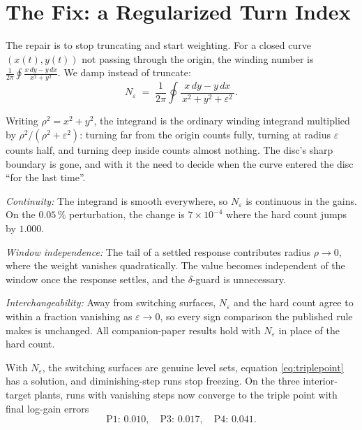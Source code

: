 \documentclass[twocolumn]{ifacconf}
\newcommand{\Neps}{N_{\varepsilon}}
\begin{document}
\section{The Fix: a Regularized Turn Index}
\label{sec:regularized}

The repair is to stop truncating and start weighting. For a closed curve
$(x(t), y(t))$ not passing through the origin, the winding number is
$\frac{1}{2\pi} \oint \frac{x\,dy - y\,dx}{x^2 + y^2}$. We damp instead of
truncate:
\begin{equation}
\Neps \;=\; \frac{1}{2\pi} \oint
\frac{x\,dy - y\,dx}{\,x^2 + y^2 + \varepsilon^2\,}.
\label{eq:neps}
\end{equation}

Writing $\rho^2 = x^2 + y^2$, the integrand is the ordinary winding integrand
multiplied by $\rho^2 / (\rho^2 + \varepsilon^2)$: turning far from the origin
counts fully, turning at radius $\varepsilon$ counts half, and turning deep
inside counts almost nothing. The disc's sharp boundary is gone, and with it
the need to decide when the curve entered the disc ``for the last time''.

\emph{Continuity:} The integrand is smooth everywhere, so $\Neps$ is continuous
in the gains. On the $0.05\,\%$ perturbation, the change is $7 \times 10^{-4}$
where the hard count jumps by $1.000$.

\emph{Window independence:} The tail of a settled response contributes radius
$\rho \to 0$, where the weight vanishes quadratically. The value becomes
independent of the window once the response settles, and the $\delta$-guard is
unnecessary.

\emph{Interchangeability:} Away from switching surfaces, $\Neps$ and the hard
count agree to within a fraction vanishing as $\varepsilon \to 0$, so every
sign comparison the published rule makes is unchanged. All companion-paper
results hold with $\Neps$ in place of the hard count.

With $\Neps$, the switching surfaces are genuine level sets, equation
\eqref{eq:triplepoint} has a solution, and diminishing-step runs stop freezing.
On the three interior-target plants, runs with vanishing steps now converge to
the triple point with final log-gain errors
\begin{equation*}
\text{P1: } 0.010, \quad \text{P3: } 0.017, \quad \text{P4: } 0.041.
\end{equation*}

\end{document}
